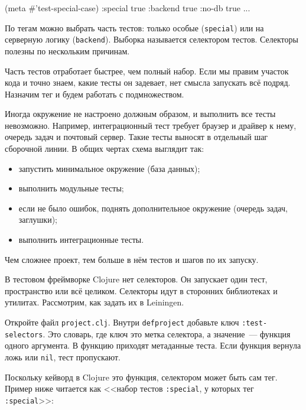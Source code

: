 \begin{english}
  \begin{clojure}
(meta #'test-special-case)
{:special true :backend true :no-db true ...}
  \end{clojure}
\end{english}

По тегам можно выбрать часть тестов: только особые (\verb|special|) или на
серверную логику (\verb|backend|). Выборка называется селектором
тестов. Селекторы полезны по нескольким причинам.

Часть тестов отработает быстрее, чем полный набор. Если мы правим участок кода
и точно знаем, какие тесты он задевает, нет смысла запускать всё
подряд. Назначим тег и будем работать с подмножеством.

Иногда окружение не настроено должным образом, и выполнить все тесты
невозможно. Например, интеграционный тест требует браузер и драйвер к нему,
очередь задач и почтовый сервер. Такие тесты выносят в отдельный шаг сборочной
линии. В общих чертах схема выглядит так:

\begin{itemize}

\item
  запустить минимальное окружение (база данных);

\item
  выполнить модульные тесты;

\item
  если не было ошибок, поднять дополнительное окружение (очередь задач,
  заглушки);

\item
  выполнить интеграционные тесты.

\end{itemize}

\noindent
Чем сложнее проект, тем больше в нём тестов и шагов по их запуску.

В тестовом фреймворке Clojure нет селекторов. Он запускает один тест,
пространство или всё целиком. Селекторы идут в сторонних библиотеках и
утилитах. Рассмотрим, как задать их в Leiningen.

Откройте файл \verb|project.clj|. Внутри \verb|defproject| добавьте ключ
\verb|:test-selectors|. Это словарь, где ключ это метка селектора, а
значение~--- функция одного аргумента. В функцию приходят метаданные теста. Если
функция вернула ложь или \verb|nil|, тест пропускают.

Поскольку кейворд в Clojure это функция, селектором может быть сам тег. Пример
ниже читается как <<набор тестов \verb|:special|, у которых тег \verb|:special|>>:

